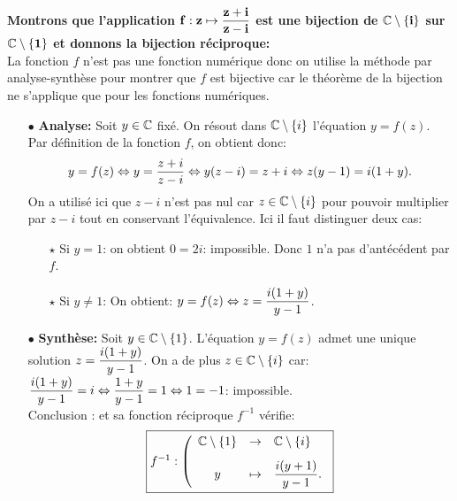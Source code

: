 \documentclass[a4paper, 11pt,reqno]{article}
\begin{document}
\begin{correction} \; \textbf{Montrons que l'application $\mathbf{f: z\mapsto \displaystyle\frac{z+i}{z-i}}$ est une bijection de $\mathbf{\mathbb{C}\setminus \lbrace i \rbrace}$ sur $\mathbf{\mathbb{C}\setminus\lbrace 1 \rbrace}$ et donnons la bijection r\'eciproque:}\\
	\noindent La fonction $f$ n'est pas une fonction num\'erique donc on utilise la m\'ethode par analyse-synth\`{e}se pour montrer que $f$ est bijective car le th\'eor\`{e}me de la bijection ne s'applique que pour les fonctions num\'eriques.
	\begin{itemize}
		\item[$\bullet$] \textbf{Analyse:} Soit $y\in\mathbb{C}$ fix\'e. On r\'esout dans $\mathbb{C}\setminus\lbrace i \rbrace$ l'\'equation $y=f(z)$. Par d\'efinition de la fonction $f$, on obtient donc:
			$$y=f(z)\Leftrightarrow y=\displaystyle\frac{z+i}{z-i}\Leftrightarrow y(z-i)=z+i\Leftrightarrow z(y-1)=i(1+y).$$
			On a utilis\'e ici que $z-i$ n'est pas nul car $z\in\mathbb{C}\setminus\lbrace i \rbrace$ pour pouvoir multiplier par $z-i$ tout en conservant l'\'equivalence. Ici il faut distinguer deux cas:
			\begin{itemize}
				\item[$\star$] Si $y=1$: on obtient $0=2i$: impossible. Donc $1$ n'a pas d'ant\'ec\'edent par $f$.
				\item[$\star$] Si $y\not=1$: On obtient: $y=f(z)\Leftrightarrow z=\displaystyle\frac{i(1+y)}{y-1}$.
			\end{itemize}
		\item[$\bullet$] \textbf{Synth\`{e}se:} Soit $y\in \mathbb{C}\setminus\lbrace 1 \rbrace$. L'\'equation $y=f(z)$ admet une unique solution $z=\displaystyle\frac{i(1+y)}{y-1}$. On a de plus $z\in\mathbb{C}\setminus\lbrace i \rbrace$ car: $\displaystyle\frac{i(1+y)}{y-1}=i\Leftrightarrow \displaystyle\frac{1+y}{y-1}=1\Leftrightarrow 1=-1$: impossible.\\
			Conclusion :  et sa fonction r\'eciproque $f^{-1}$ v\'erifie:
			$$\fbox{$f^{-1}: \left( \begin{array}{cll}
							\bC\setminus\lbrace 1 \rbrace & \rightarrow & \bC\setminus\lbrace i \rbrace\vsec \\
							y                             & \mapsto     & \ddp\frac{i(y+1)}{y-1}.
						\end{array}\right.$}$$
	\end{itemize}
\end{correction}
\end{document}
